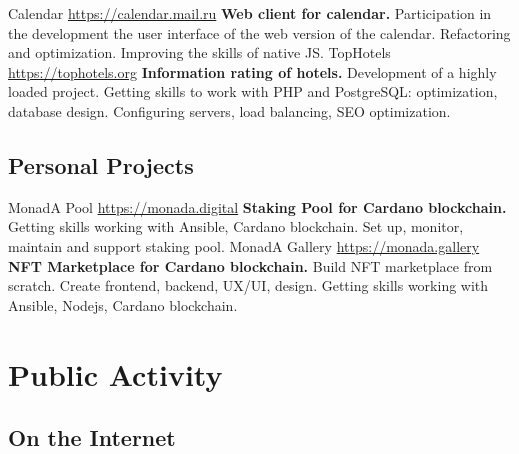 \documentclass[11pt,a4paper]{moderncv}
\begin{document}
  \cvline
    {Calendar}
    {\url{https://calendar.mail.ru}\newline{}
    \textbf{Web client for calendar.}\newline{}
    Participation in the development the user interface of the web version of the calendar.\newline{}
    Refactoring and optimization. Improving the skills of native JS.}
  \cvline
    {TopHotels}
    {\url{https://tophotels.org}\newline{}
    \textbf{Information rating of hotels.}\newline{}
    Development of a highly loaded project.
    Getting skills to work with PHP and PostgreSQL: optimization, database design.
    Configuring servers, load balancing, SEO optimization.}

\newpage

  \subsection{Personal Projects}
  \cvline
    {MonadA Pool}
    {\url{https://monada.digital}\newline{}
    \textbf{Staking Pool for Cardano blockchain.}\newline{}
    Getting skills working with Ansible, Cardano blockchain. Set up, monitor, maintain and support staking pool.}
  \cvline
    {MonadA Gallery}
    {\url{https://monada.gallery}\newline{}
    \textbf{NFT Marketplace for Cardano blockchain.}\newline{}
    Build NFT marketplace from scratch. Create frontend, backend, UX/UI, design. Getting skills working with Ansible, Nodejs, Cardano blockchain.}

\section{Public Activity}
  \subsection{On the Internet}
\end{document}
